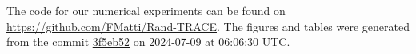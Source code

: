 The code for our numerical experiments can be found on \url{https://github.com/FMatti/Rand-TRACE}. The figures and tables were generated from the commit \href{https://github.com/FMatti/Rand-TRACE/tree/3f5eb52}{3f5eb52} on 2024-07-09 at 06:06:30 UTC.
